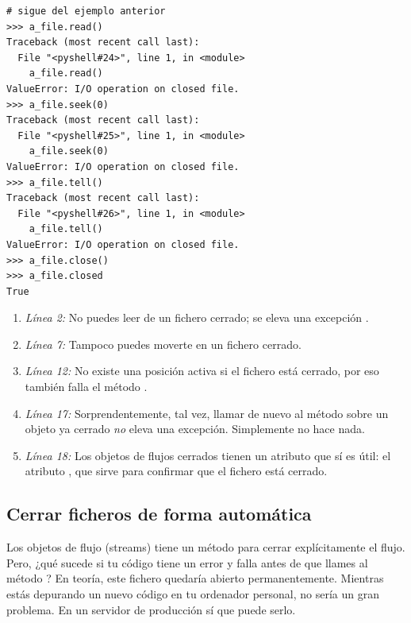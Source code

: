 \noindent\begin{minipage}{\textwidth}
\begin{lstlisting}[mathescape=True]
# sigue del ejemplo anterior 
>>> a_file.read()
Traceback (most recent call last):
  File "<pyshell#24>", line 1, in <module>
    a_file.read()
ValueError: I/O operation on closed file.
>>> a_file.seek(0)
Traceback (most recent call last):
  File "<pyshell#25>", line 1, in <module>
    a_file.seek(0)
ValueError: I/O operation on closed file.
>>> a_file.tell()
Traceback (most recent call last):
  File "<pyshell#26>", line 1, in <module>
    a_file.tell()
ValueError: I/O operation on closed file.
>>> a_file.close()
>>> a_file.closed
True
\end{lstlisting}
\end{minipage}

\begin{enumerate}

\item \emph{Línea 2:} No puedes leer de un fichero cerrado; se eleva una excepción .

\item \emph{Línea 7:} Tampoco puedes moverte en un fichero cerrado.

\item \emph{Línea 12:} No existe una posición activa si el fichero está cerrado, por eso también falla el método .

\item \emph{Línea 17:} Sorprendentemente, tal vez, llamar de nuevo al método  sobre un objeto ya cerrado \emph{no} eleva una excepción. Simplemente no hace nada.

\item \emph{Línea 18:} Los objetos de flujos cerrados tienen un atributo que sí es útil: el atributo , que sirve para confirmar que el fichero está cerrado.

\end{enumerate}

\subsection{Cerrar ficheros de forma automática}

Los objetos de flujo (streams) tiene un método  para cerrar explícitamente el flujo. Pero, ¿qué sucede si tu código tiene un error y falla antes de que llames al método ? En teoría, este fichero quedaría abierto permanentemente. Mientras estás depurando un nuevo código en tu ordenador personal, no sería un gran problema. En un servidor de producción sí que puede serlo.

